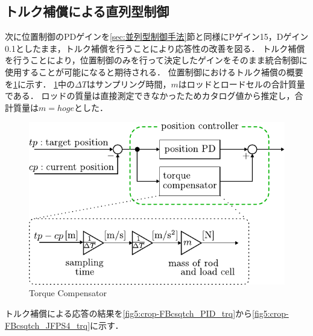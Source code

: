 \clearpage
\subsection{トルク補償による直列型制御}
次に位置制御のPDゲインを\ref{sec:並列型制御手法}節と同様にPゲイン15，Dゲイン0.1としたまま，トルク補償を行うことにより応答性の改善を図る．
トルク補償を行うことにより，位置制御のみを行って決定したゲインをそのまま統合制御に使用することが可能になると期待される．
位置制御におけるトルク補償の概要を\figname\ref{fig5:torque_compensator}に示す．
\figname\ref{fig5:torque_compensator}中の$\Delta T$はサンプリング時間，$m$はロッドとロードセルの合計質量である．
ロッドの質量は直接測定できなかったためカタログ値から推定し，合計質量は$m=hoge$とした．

\begin{figure}[t]
    \centering
        \includegraphics[keepaspectratio, scale=1.0]{contents/IntegrationControl/figure/torque_compensator.pdf}
        \caption{Torque Compensator}
        \label{fig5:torque_compensator}
\end{figure}

トルク補償による応答の結果を\figname\ref{fig5:crop-FBcsqtch_PID_trq}から\figname\ref{fig5:crop-FBcsqtch_JFPS4_trq}に示す．


